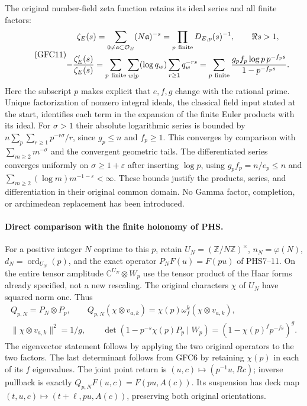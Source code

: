 The original number-field zeta function retains its ideal series and
all finite factors:
\begin{equation}\tag{GFC11}
 \begin{gathered}
 \zeta_E(s)=\sum_{0\ne\mathfrak a\subset\mathcal O_E}
                       (N\mathfrak a)^{-s}
          =\prod_{p\ {\rm finite}}D_{E,p}(s)^{-1},
          \qquad \Re s>1,\\
 -\frac{\zeta_E'(s)}{\zeta_E(s)}
   =\sum_{p\ {\rm finite}}\sum_{w\mid p}
       (\log q_w)\sum_{r\ge1}q_w^{-rs}
   =\sum_{p\ {\rm finite}}\frac{g_pf_p\log p\,p^{-f_ps}}
                                     {1-p^{-f_ps}}.
 \end{gathered}
\end{equation}
Here the subscript $p$ makes explicit that $e,f,g$ change with the
rational prime. Unique factorization of nonzero integral ideals,
the classical field input stated at the start, identifies each term
in the expansion of the finite Euler products with its ideal.
For $\sigma>1$ their absolute logarithmic series is bounded by
$n\sum_p\sum_{r\ge1}p^{-r\sigma}/r$, since $g_p\le n$ and $f_p\ge1$.
This converges by comparison with $\sum_{m\ge2}m^{-\sigma}$ and
the convergent geometric tails. The differentiated series converges
uniformly on $\sigma\ge1+\varepsilon$ after inserting $\log p$,
using $g_pf_p=n/e_p\le n$ and
$\sum_{m\ge2}(\log m)m^{-1-\varepsilon}<\infty$.
These bounds justify the products, series, and differentiation in
their original common domain. No Gamma factor, completion, or
archimedean replacement has been introduced.

\paragraph{Direct comparison with the finite holonomy of PHS.}
For a positive integer $N$ coprime to this $p$, retain
$U_N=(\mathbb Z/N\mathbb Z)^\times$, $n_N=\varphi(N)$,
$d_N=\operatorname{ord}_{U_N}(p)$, and the exact operator
$P_NF(u)=F(pu)$ of PHS7--11. On the entire tensor amplitude
$\mathbb C^{U_N}\otimes W_p$ use the tensor product of the Haar
forms already specified, not a new rescaling. The original
characters $\chi$ of $U_N$ have squared norm one. Thus
\begin{equation}\tag{GFC11a}
 \begin{gathered}
 Q_{p,N}=P_N\otimes P_p,\qquad
 Q_{p,N}(\chi\otimes v_{a,k})
       =\chi(p)\omega_f^k(\chi\otimes v_{a,k}),\\
 \|\chi\otimes v_{a,k}\|^2=1/g,\qquad
 \det(1-p^{-s}\chi(p)P_p\mid W_p)
                  =(1-\chi(p)^f p^{-fs})^g.
 \end{gathered}
\end{equation}
The eigenvector statement follows by applying the two original
operators to the two factors. The last determinant follows from
GFC6 by retaining $\chi(p)$ in each of its $f$ eigenvalues.
The joint point return is $(u,c)\mapsto(p^{-1}u,Rc)$; inverse
pullback is exactly $Q_{p,N}F(u,c)=F(pu,A(c))$. Its suspension
has deck map $(t,u,c)\mapsto(t+\ell,pu,A(c))$, preserving both
original orientations.

